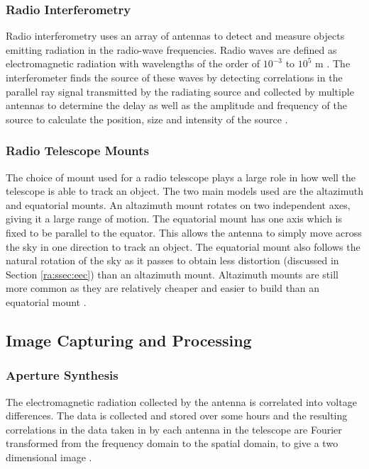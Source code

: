 \subsubsection{Radio Interferometry}\label{ra:ssec:des}
Radio interferometry uses an array of antennas to detect and measure objects emitting radiation in the radio-wave frequencies. Radio waves are defined as electromagnetic radiation with wavelengths of the order of $10^{-3}$ to $10^5$ m \citep{cheng2009radio}. The interferometer finds the source of these waves by detecting correlations in the parallel ray signal transmitted by the radiating source \citet{tasse2016tessellation} and collected by multiple antennas to determine the delay as well as the amplitude and frequency of the source to calculate the position, size and intensity of the source \citep{thompson2008interferometry}.
%
\subsubsection{Radio Telescope Mounts}\label{ra:ssec:mount}
The choice of mount used for a radio telescope plays a large role in how well the telescope is able to track an object. The two main models used are the altazimuth and equatorial mounts. An altazimuth mount rotates on two independent axes, giving it a large range of motion. The equatorial mount has one axis which is fixed to be parallel to the equator. This allows the antenna to simply move across the sky in one direction to track an object. The equatorial mount also follows the natural rotation of the sky as it passes to obtain less distortion (discussed in Section \ref{ra:ssec:eec}) than an altazimuth mount. Altazimuth mounts are still more common as they are relatively cheaper and easier to build than an equatorial mount \citep{thompson2008interferometry}.
%
\subsection{Image Capturing and Processing}\label{ra:sec:ic}
%
\subsubsection{Aperture Synthesis}\label{ra:ssec:rii}
The electromagnetic radiation collected by the antenna is correlated into voltage differences. The data is collected and stored over some hours and the resulting correlations in the data taken in by each antenna in the telescope are Fourier transformed from the frequency domain to the spatial domain, to give a two dimensional image \citep{sault1994multi}.
%
